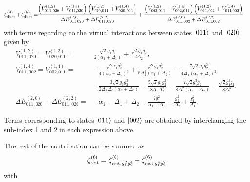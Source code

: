 \documentclass[%
 reprint,
 amsmath,amssymb,
 aps,
pra,
noeprint,
superscriptaddress,
]{revtex4-2}
\begin{document}
\begin{widetext}
\begin{align}
    \zeta^{(4)}_{\textnormal{disp}} + \zeta^{(6)}_{\textnormal{disp}}
    =& \frac{\left(V_{011,020}^{(1,2)} + V_{011,020}^{(1,4)}\right) \left(V_{020,011}^{(1,2)} + V_{020,011}^{(1,4)}\right)}{\Delta E^{(2,0)}_{011,020} + \Delta E^{(2,2)}_{011,020}} + \frac{\left(V_{002,011}^{(1,2)} + V_{002,011}^{(1,4)}\right) \left(V_{011,002}^{(1,2)} + V_{011,002}^{(1,4)}\right)}{\Delta E^{(2,0)}_{011,002} + \Delta E^{(2,2)}_{011,002}}
\end{align}
with terms regarding to the virtual interactions between states $\ket{011}$ and $\ket{020}$ given by
\begin{align}
    V_{011,020}^{(1,2)} = V_{020, 011}^{(1,2)} =& 
    \frac{\sqrt{2} g_{1} g_{2}}{2 \left(\alpha_1 + \Delta_{1}\right)} + \frac{\sqrt{2} g_{1} g_{2}}{2 \Delta_{2}}
    ,\\
    V_{011,002}^{(1,4)} = V_{002, 011}^{(1,4)} = & 
    - \frac{\sqrt{2} g_{1} g_{2}^{3}}{4 \left(\alpha_2 + \Delta_{2}\right)^{3}} + \frac{\sqrt{2} g_{1} g_{2}^{3}}{8 \Delta_{2}^{2} \left(\alpha_2 + \Delta_{2}\right)} - \frac{7 \sqrt{2} g_{1} g_{2}^{3}}{4 \Delta_{1} \left(\alpha_2 + \Delta_{2}\right)^{2}}
     \nonumber\\ 
     & + \frac{3 \sqrt{2} g_{1} g_{2}^{3}}{2 \Delta_{1} \Delta_{2} \left(\alpha_2 + \Delta_{2}\right)} - \frac{5 \sqrt{2} g_{1} g_{2}^{3}}{8 \Delta_{1} \Delta_{2}^{2}} - \frac{7 \sqrt{2} g_{1}^{3} g_{2}}{8 \Delta_{1}^{2} \left(\alpha_2 + \Delta_{2}\right)} - \frac{\sqrt{2} g_{1}^{3} g_{2}}{8 \Delta_{1}^{3}}
    ,\\
    \Delta E^{(2,0)}_{011,020} + \Delta E^{(2,2)}_{011,020} =&
    - \alpha_1 - \Delta_{1} + \Delta_{2} - \frac{2 g_{1}^{2}}{\alpha_1 + \Delta_{1}} + \frac{g_{2}^{2}}{\Delta_{2}} + \frac{g_{1}^{2}}{\Delta_{1}}
    .
\end{align}

Terms corresponding to states $\ket{011}$ and $\ket{002}$ are obtained by interchanging the sub-index 1 and 2 in each expression above.

The rest of the contribution can be summed as
\begin{equation}
    \zeta^{(6)}_{\textnormal{rest}} = 
    \zeta^{(6)}_{\textnormal{rest}, g_{1}^{2} g_{2}^{4}} + \zeta^{(6)}_{\textnormal{rest}, g_{1}^{4} g_{2}^{2}}
\end{equation}
with


\end{widetext}
\end{document}
